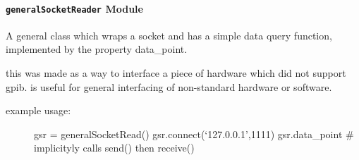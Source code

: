 \documentclass[letterpaper,10pt,english]{sphinxmanual}
\begin{document}
\paragraph{\texttt{generalSocketReader} Module}
\label{api/mwavepy.virtualInstruments:module-mwavepy.virtualInstruments.generalSocketReader}\label{api/mwavepy.virtualInstruments:generalsocketreader-module}

\begin{fulllineitems}
\label{api/mwavepy.virtualInstruments:mwavepy.virtualInstruments.generalSocketReader.GeneralSocketReader}
A general class which wraps a socket and has a simple data query
function, implemented by the property data\_point.

this was made as a way to interface a piece of hardware which did
not support     gpib.  is useful for general interfacing  of 
non-standard hardware or software.
\begin{description}
\item[{example usage:}] \leavevmode
gsr = generalSocketRead()
gsr.connect(`127.0.0.1',1111)
gsr.data\_point  \# implicityly calls send() then receive()

\end{description}

\begin{fulllineitems}
\label{api/mwavepy.virtualInstruments:mwavepy.virtualInstruments.generalSocketReader.GeneralSocketReader.close}
\end{fulllineitems}


\begin{fulllineitems}
\label{api/mwavepy.virtualInstruments:mwavepy.virtualInstruments.generalSocketReader.GeneralSocketReader.connect}
\end{fulllineitems}


\end{fulllineitems}
\end{document}
